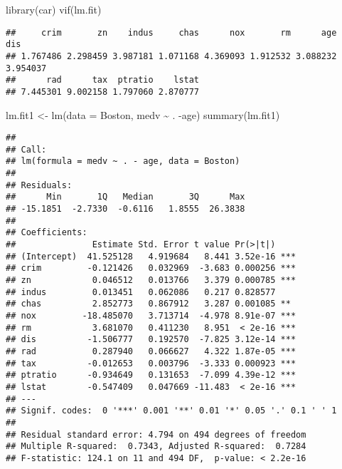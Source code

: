 \documentclass[
]{article}
\newenvironment{Shaded}{\begin{snugshade}}{\end{snugshade}}
\newcommand{\AttributeTok}[1]{\textcolor[rgb]{0.77,0.63,0.00}{#1}}
\newcommand{\FunctionTok}[1]{\textcolor[rgb]{0.00,0.00,0.00}{#1}}
\newcommand{\NormalTok}[1]{#1}
\newcommand{\OtherTok}[1]{\textcolor[rgb]{0.56,0.35,0.01}{#1}}
\newcommand{\SpecialCharTok}[1]{\textcolor[rgb]{0.00,0.00,0.00}{#1}}
\begin{document}
\begin{Shaded}
\begin{Highlighting}[]
\FunctionTok{library}\NormalTok{(car)}
\FunctionTok{vif}\NormalTok{(lm.fit)}
\end{Highlighting}
\end{Shaded}

\begin{verbatim}
##     crim       zn    indus     chas      nox       rm      age      dis 
## 1.767486 2.298459 3.987181 1.071168 4.369093 1.912532 3.088232 3.954037 
##      rad      tax  ptratio    lstat 
## 7.445301 9.002158 1.797060 2.870777
\end{verbatim}

\begin{Shaded}
\begin{Highlighting}[]
\NormalTok{lm.fit1 }\OtherTok{\textless{}{-}} \FunctionTok{lm}\NormalTok{(}\AttributeTok{data =}\NormalTok{ Boston, medv }\SpecialCharTok{\textasciitilde{}}\NormalTok{ . }\SpecialCharTok{{-}}\NormalTok{age)}
\FunctionTok{summary}\NormalTok{(lm.fit1)}
\end{Highlighting}
\end{Shaded}

\begin{verbatim}
## 
## Call:
## lm(formula = medv ~ . - age, data = Boston)
## 
## Residuals:
##      Min       1Q   Median       3Q      Max 
## -15.1851  -2.7330  -0.6116   1.8555  26.3838 
## 
## Coefficients:
##               Estimate Std. Error t value Pr(>|t|)    
## (Intercept)  41.525128   4.919684   8.441 3.52e-16 ***
## crim         -0.121426   0.032969  -3.683 0.000256 ***
## zn            0.046512   0.013766   3.379 0.000785 ***
## indus         0.013451   0.062086   0.217 0.828577    
## chas          2.852773   0.867912   3.287 0.001085 ** 
## nox         -18.485070   3.713714  -4.978 8.91e-07 ***
## rm            3.681070   0.411230   8.951  < 2e-16 ***
## dis          -1.506777   0.192570  -7.825 3.12e-14 ***
## rad           0.287940   0.066627   4.322 1.87e-05 ***
## tax          -0.012653   0.003796  -3.333 0.000923 ***
## ptratio      -0.934649   0.131653  -7.099 4.39e-12 ***
## lstat        -0.547409   0.047669 -11.483  < 2e-16 ***
## ---
## Signif. codes:  0 '***' 0.001 '**' 0.01 '*' 0.05 '.' 0.1 ' ' 1
## 
## Residual standard error: 4.794 on 494 degrees of freedom
## Multiple R-squared:  0.7343, Adjusted R-squared:  0.7284 
## F-statistic: 124.1 on 11 and 494 DF,  p-value: < 2.2e-16
\end{verbatim}
\end{document}
